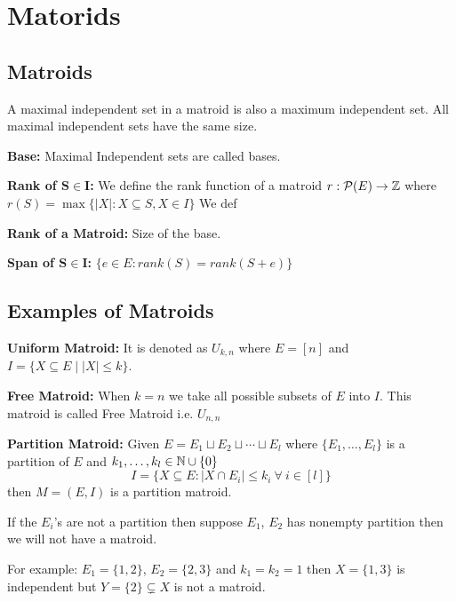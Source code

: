 \chapter{Matorids}
\section{Matroids}
\begin{observation*}
	A maximal independent set in a matroid is also a maximum independent set. All maximal independent sets have the same size.
\end{observation*}
\parinf

\textbf{Base:} Maximal Independent sets are called bases.

\textbf{Rank of $\boldsymbol{S\in I}$:} We define the rank function of a matroid $r:\mathcal{P}(E)\to \mathbb{Z}$ where $r(S)=\max\{|X|\colon X\subseteq S, X\in I\}$ We def

\textbf{Rank of a Matroid:} Size of the base.

\textbf{Span of $\boldsymbol{S\in I}$:} $\{e\in E\colon rank(S)=rank(S+e)\}$

\section{Examples of Matroids}
\parinf
\textbf{{Uniform Matroid:} }It is {denoted as $U_{k,n}$ where $E=[n]$ and $I=\{X\subseteq E\mid |X|\leq k\}$.}


\textbf{Free Matroid: }When $k=n$ we take all possible subsets of $E$ into $I$. This matroid is called {Free Matroid} i.e. $U_{n,n}$\parinn

\textbf{Partition Matroid:} Given $E=E_1\sqcup E_2\sqcup \cdots \sqcup E_l$ where $\{E_1,\dots, E_l\}$ is a partition of $E$ and $k_1,\dots,k_l\in \mathbb{N}\cup \{0\}$ $$I=\{X\subseteq E\colon |X\cap E_i|\leq k_i\ \forall \ i\in[l]\}$$then $M=(E,I)$ is a partition matroid.
\begin{note}
	If the $E_i$'s are not a partition then suppose $E_1$, $E_2$ has nonempty partition then we will not have a matroid. 
	
\parinn	For example: $E_1=\{1,2\}$, $E_2=\{2,3\}$ and $k_1=k_2=1$ then $X=\{1,3\}$ is independent but $Y=\{2\}\subsetneq X$ is not a matroid. 
\end{note}\parinf

